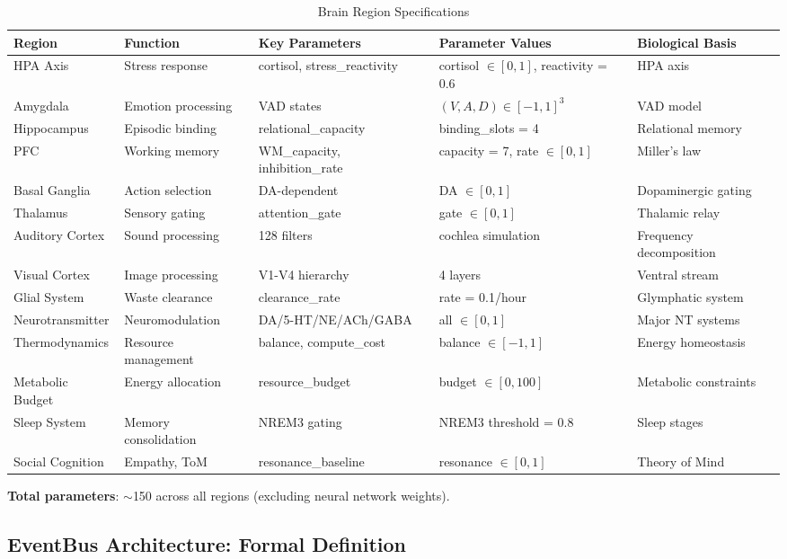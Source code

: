 \documentclass[preprint,12pt]{elsarticle}
\begin{document}
\begin{table}[htbp]
\centering
\caption{Brain Region Specifications}
\label{tab:regions}
\scriptsize
\begin{tabular}{lllll}
\toprule
\textbf{Region} & \textbf{Function} & \textbf{Key Parameters} & \textbf{Parameter Values} & \textbf{Biological Basis} \\
\midrule
HPA Axis & Stress response & cortisol, stress\_reactivity & cortisol $\in [0,1]$, reactivity = 0.6 & HPA axis \\
Amygdala & Emotion processing & VAD states & $(V,A,D) \in [-1,1]^3$ & VAD model \\
Hippocampus & Episodic binding & relational\_capacity & binding\_slots = 4 & Relational memory \\
PFC & Working memory & WM\_capacity, inhibition\_rate & capacity = 7, rate $\in [0,1]$ & Miller's law \\
Basal Ganglia & Action selection & DA-dependent & DA $\in [0,1]$ & Dopaminergic gating \\
Thalamus & Sensory gating & attention\_gate & gate $\in [0,1]$ & Thalamic relay \\
Auditory Cortex & Sound processing & 128 filters & cochlea simulation & Frequency decomposition \\
Visual Cortex & Image processing & V1-V4 hierarchy & 4 layers & Ventral stream \\
Glial System & Waste clearance & clearance\_rate & rate = 0.1/hour & Glymphatic system \\
Neurotransmitter & Neuromodulation & DA/5-HT/NE/ACh/GABA & all $\in [0,1]$ & Major NT systems \\
Thermodynamics & Resource management & balance, compute\_cost & balance $\in [-1,1]$ & Energy homeostasis \\
Metabolic Budget & Energy allocation & resource\_budget & budget $\in [0,100]$ & Metabolic constraints \\
Sleep System & Memory consolidation & NREM3 gating & NREM3 threshold = 0.8 & Sleep stages \\
Social Cognition & Empathy, ToM & resonance\_baseline & resonance $\in [0,1]$ & Theory of Mind \\
\bottomrule
\end{tabular}
\end{table}

\textbf{Total parameters}: $\sim$150 across all regions (excluding neural network weights).

\subsection{EventBus Architecture: Formal Definition}
\end{document}
